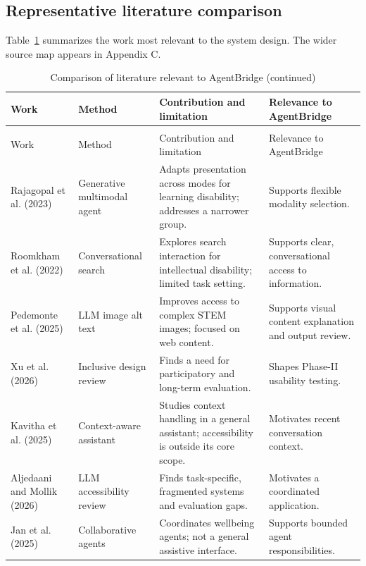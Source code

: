 \documentclass[12pt,a4paper,oneside]{report}
\begin{document}
\subsection{Representative literature comparison}
Table~\ref{tab:lit} summarizes the work most relevant to the system design. The wider source map appears in Appendix C.
\begingroup\footnotesize{}\setlength{\tabcolsep}{3pt}\renewcommand{\arraystretch}{1.12}
\begin{longtable}{|>{\raggedright\arraybackslash}p{}|>{\raggedright\arraybackslash}p{}|>{\raggedright\arraybackslash}p{}|>{\raggedright\arraybackslash}p{}|}
\caption{Comparison of literature relevant to AgentBridge}\label{tab:lit}\\\hline
Work & Method & Contribution and limitation & Relevance to AgentBridge\\\hline\endfirsthead
\caption[]{Comparison of literature relevant to AgentBridge (continued)}\\\hline
Work & Method & Contribution and limitation & Relevance to AgentBridge\\\hline\endhead
Rajagopal et al. (2023) \cite{rajagopal} & Generative multimodal agent & Adapts presentation across modes for learning disability; addresses a narrower group. & Supports flexible modality selection.\\\hline
Roomkham et al. (2022) \cite{roomkham} & Conversational search & Explores search interaction for intellectual disability; limited task setting. & Supports clear, conversational access to information.\\\hline
Pedemonte et al. (2025) \cite{pedemonte} & LLM image alt text & Improves access to complex STEM images; focused on web content. & Supports visual content explanation and output review.\\\hline
Xu et al. (2026) \cite{xu} & Inclusive design review & Finds a need for participatory and long-term evaluation. & Shapes Phase-II usability testing.\\\hline
Kavitha et al. (2025) \cite{kavitha} & Context-aware assistant & Studies context handling in a general assistant; accessibility is outside its core scope. & Motivates recent conversation context.\\\hline
Aljedaani and Mollik (2026) \cite{aljedaani} & LLM accessibility review & Finds task-specific, fragmented systems and evaluation gaps. & Motivates a coordinated application.\\\hline
Jan et al. (2025) \cite{jan} & Collaborative agents & Coordinates wellbeing agents; not a general assistive interface. & Supports bounded agent responsibilities.\\\hline

\end{longtable}
\end{document}
